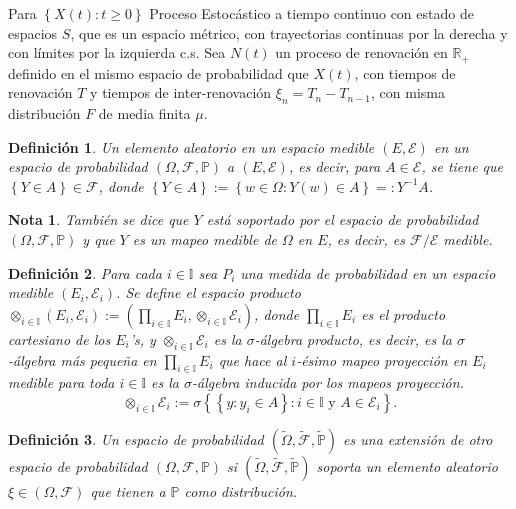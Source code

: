\documentclass{article}
\newtheorem{Def}{Definición}
\newtheorem{Note}{Nota}
\newcommand{\rea}{\mathbb{R}}
\newcommand{\prob}{\mathbb{P}}
\begin{document}
Para $\left\{X\left(t\right):t\geq0\right\}$ Proceso Estoc\'astico a tiempo continuo con estado de espacios $S$, que es un espacio m\'etrico, con trayectorias continuas por la derecha y con l\'imites por la izquierda c.s. Sea $N\left(t\right)$ un proceso de renovaci\'on en $\rea_{+}$ definido en el mismo espacio de probabilidad que $X\left(t\right)$, con tiempos de renovaci\'on $T$ y tiempos de inter-renovaci\'on $\xi_{n}=T_{n}-T_{n-1}$, con misma distribuci\'on $F$ de media finita $\mu$.

\begin{Def}
Un elemento aleatorio en un espacio medible $\left(E,\mathcal{E}\right)$ en un espacio de probabilidad $\left(\Omega,\mathcal{F},\prob\right)$ a $\left(E,\mathcal{E}\right)$, es decir,
para $A\in \mathcal{E}$,  se tiene que $\left\{Y\in A\right\}\in\mathcal{F}$, donde $\left\{Y\in A\right\}:=\left\{w\in\Omega:Y\left(w\right)\in A\right\}=:Y^{-1}A$.
\end{Def}

\begin{Note}
Tambi\'en se dice que $Y$ est\'a soportado por el espacio de probabilidad $\left(\Omega,\mathcal{F},\prob\right)$ y que $Y$ es un mapeo medible de $\Omega$ en $E$, es decir, es $\mathcal{F}/\mathcal{E}$ medible.
\end{Note}

\begin{Def}
Para cada $i\in \mathbb{I}$ sea $P_{i}$ una medida de probabilidad en un espacio medible $\left(E_{i},\mathcal{E}_{i}\right)$. Se define el espacio producto
$\otimes_{i\in\mathbb{I}}\left(E_{i},\mathcal{E}_{i}\right):=\left(\prod_{i\in\mathbb{I}}E_{i},\otimes_{i\in\mathbb{I}}\mathcal{E}_{i}\right)$, donde $\prod_{i\in\mathbb{I}}E_{i}$ es el producto cartesiano de los $E_{i}$'s, y $\otimes_{i\in\mathbb{I}}\mathcal{E}_{i}$ es la $\sigma$-\'algebra producto, es decir, es la $\sigma$-\'algebra m\'as peque\~na en $\prod_{i\in\mathbb{I}}E_{i}$ que hace al $i$-\'esimo mapeo proyecci\'on en $E_{i}$ medible para toda $i\in\mathbb{I}$ es la $\sigma$-\'algebra inducida por los mapeos proyecci\'on. $$\otimes_{i\in\mathbb{I}}\mathcal{E}_{i}:=\sigma\left\{\left\{y:y_{i}\in A\right\}:i\in\mathbb{I}\textrm{ y }A\in\mathcal{E}_{i}\right\}.$$
\end{Def}

\begin{Def}
Un espacio de probabilidad $\left(\tilde{\Omega},\tilde{\mathcal{F}},\tilde{\prob}\right)$ es una extensi\'on de otro espacio de probabilidad $\left(\Omega,\mathcal{F},\prob\right)$ si $\left(\tilde{\Omega},\tilde{\mathcal{F}},\tilde{\prob}\right)$ soporta un elemento aleatorio $\xi\in\left(\Omega,\mathcal{F}\right)$ que tienen a $\prob$ como distribuci\'on.
\end{Def}
\end{document}
